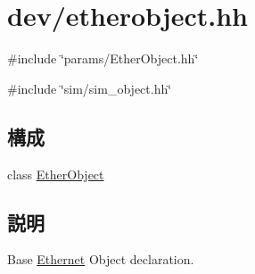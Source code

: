 \hypertarget{etherobject_8hh}{
\section{dev/etherobject.hh}
\label{etherobject_8hh}
}
{\ttfamily \#include \char`\"{}params/EtherObject.hh\char`\"{}}\par
{\ttfamily \#include \char`\"{}sim/sim\_\-object.hh\char`\"{}}\par
\subsection*{構成}
\begin{DoxyCompactItemize}
\item 
class \hyperlink{classEtherObject}{EtherObject}
\end{DoxyCompactItemize}


\subsection{説明}
Base \hyperlink{namespaceEthernet}{Ethernet} Object declaration. 